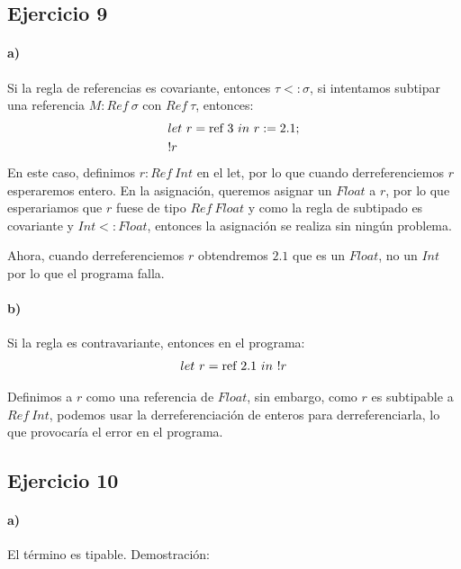 \documentclass[10pt,a4paper, landscape]{article}
\begin{document}
\subsection{Ejercicio 9}
\begin{multicols}{2}
	\paragraph{a)} Si la regla de referencias es covariante, entonces $\tau <: \sigma$, si intentamos subtipar una referencia $M:Ref~\sigma$ con $Ref~\tau$, entonces:
		\begin{align*}
		&let~r = \text{ref}~3~in~r := 2.1; \\
		&!r
		\end{align*}
		En este caso, definimos $r : Ref~Int$ en el let, por lo que cuando derreferenciemos $r$ esperaremos entero. En la asignación, queremos asignar un $Float$ a $r$, por lo que esperariamos que $r$ fuese de tipo $Ref~Float$ y como la regla de subtipado es covariante y $Int <: Float$, entonces la asignación se realiza sin ningún problema.
		
		Ahora, cuando derreferenciemos $r$ obtendremos $2.1$ que es un $Float$, no un $Int$ por lo que el programa falla.
		
		\vfill\null
		\columnbreak
		\paragraph{b)} Si la regla es contravariante, entonces en el programa:
		\begin{align*}
		let~r = \text{ref}~2.1~in~!r
		\end{align*}
		
		Definimos a $r$ como una referencia de $Float$, sin embargo, como $r$ es subtipable a $Ref~Int$, podemos usar la derreferenciación de enteros para derreferenciarla, lo que provocaría el error en el programa.
		
\end{multicols}

	\newpage
	\subsection{Ejercicio 10}
	\paragraph{a)} El término es tipable. Demostración:
	
\end{document}
